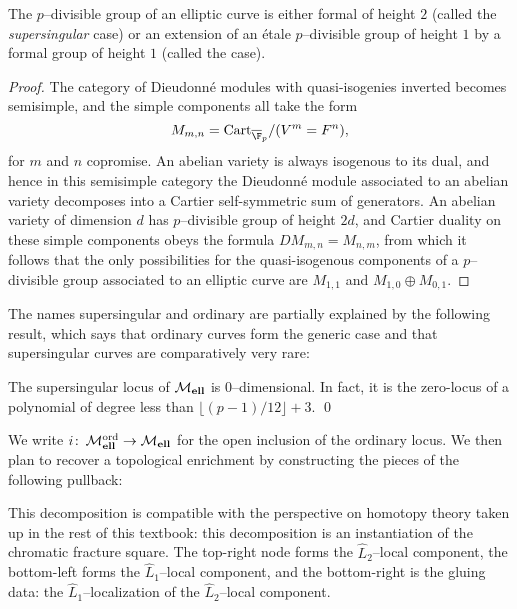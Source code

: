 \begin{lemma}
The $p$--divisible group of an elliptic curve is either formal of height $2$ (called the \textit{supersingular} case) or an extension of an \'etale $p$--divisible group of height $1$ by a formal group of height $1$ (called the  case).
\end{lemma}
\begin{proof}
The category of Dieudonn\'e modules with quasi-isogenies inverted becomes semisimple, and the simple components all take the form \[M_{m, n} = \Cart_{\overline{\F}_p} / (V^m = F^n),\] for $m$ and $n$ copromise.  An abelian variety is always isogenous to its dual, and hence in this semisimple category the Dieudonn\'e module associated to an abelian variety decomposes into a Cartier self-symmetric sum of generators.  An abelian variety of dimension $d$ has $p$--divisible group of height $2d$, and Cartier duality on these simple components obeys the formula $DM_{m,n} = M_{n,m}$, from which it follows that the only possibilities for the quasi-isogenous components of a $p$--divisible group associated to an elliptic curve are $M_{1,1}$ and $M_{1,0} \oplus M_{0,1}$.
\end{proof}

The names supersingular and ordinary are partially explained by the following result, which says that ordinary curves form the generic case and that supersingular curves are comparatively very rare:

\begin{lemma}
The supersingular locus of $\mathcal{M}_{\mathbf{ell}}$ is $0$--dimensional.  In fact, it is the zero-locus of a polynomial of degree less than $\lfloor (p-1)/12 \rfloor + 3$. \qed
\end{lemma}

\noindent We write $i\colon\thinspace \mathcal{M}_{\mathbf{ell}}^{\mathrm{ord}} \to \mathcal{M}_{\mathbf{ell}}$ for the open inclusion of the ordinary locus.  We then plan to recover a topological enrichment by constructing the pieces of the following pullback:
\begin{center}
\end{center}
This decomposition is compatible with the perspective on homotopy theory taken up in the rest of this textbook: this decomposition is an instantiation of the chromatic fracture square.  The top-right node forms the $\widehat L_2$--local component, the bottom-left forms the $\widehat L_1$--local component, and the bottom-right is the gluing data: the $\widehat L_1$--localization of the $\widehat L_2$--local component.






